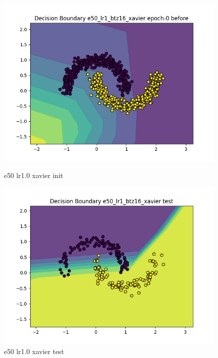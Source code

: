 \documentclass[8pt]{article}
\begin{document}
\begin{figure}[H]
    \centering
    \begin{minipage}{0.32\textwidth}
        \centering
        \includegraphics[width=\textwidth]{../Prob4/out/1024_173617/e50_lr1_btz16_xavier/decision_boundary_epoch-0 before.png}
        \caption{e50 lr1.0 xavier init}
        \label{fig:e50 lr1.0 xavier init}
    \end{minipage}
    \begin{minipage}{0.32\textwidth}
        \centering
        \includegraphics[width=\textwidth]{../Prob4/out/1024_173617/e50_lr1_btz16_xavier/decision_boundary_test.png}
        \caption{e50 lr1.0 xavier test}
        \label{fig:e50 lr1.0 xavier test}
    \end{minipage}

\end{figure}
\end{document}
